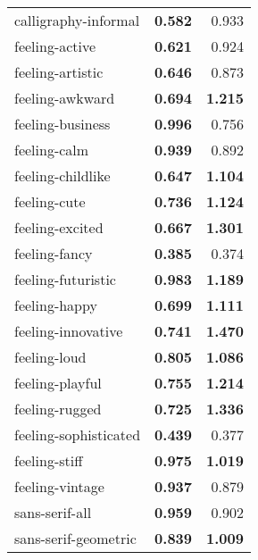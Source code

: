 \begin{longtable}{|l|r|r|}
calligraphy-informal      & \textbf{0.582}             & 0.933                   \\
feeling-active            & \textbf{0.621}             & 0.924                   \\
feeling-artistic          & \textbf{0.646}             & 0.873                   \\
feeling-awkward           & \textbf{0.694}             & \textbf{1.215}          \\
feeling-business          & \textbf{0.996}             & 0.756                   \\
feeling-calm              & \textbf{0.939}             & 0.892                   \\
feeling-childlike         & \textbf{0.647}             & \textbf{1.104}          \\
feeling-cute              & \textbf{0.736}             & \textbf{1.124}          \\
feeling-excited           & \textbf{0.667}             & \textbf{1.301}          \\
feeling-fancy             & \textbf{0.385}             & 0.374                   \\
feeling-futuristic        & \textbf{0.983}             & \textbf{1.189}          \\
feeling-happy             & \textbf{0.699}             & \textbf{1.111}          \\
feeling-innovative        & \textbf{0.741}             & \textbf{1.470}          \\
feeling-loud              & \textbf{0.805}             & \textbf{1.086}          \\
feeling-playful           & \textbf{0.755}             & \textbf{1.214}          \\
feeling-rugged            & \textbf{0.725}             & \textbf{1.336}          \\
feeling-sophisticated     & \textbf{0.439}             & 0.377                   \\
feeling-stiff             & \textbf{0.975}             & \textbf{1.019}          \\
feeling-vintage           & \textbf{0.937}             & 0.879                   \\
sans-serif-all            & \textbf{0.959}             & 0.902                   \\
sans-serif-geometric      & \textbf{0.839}             & \textbf{1.009}          \\

\end{longtable}
